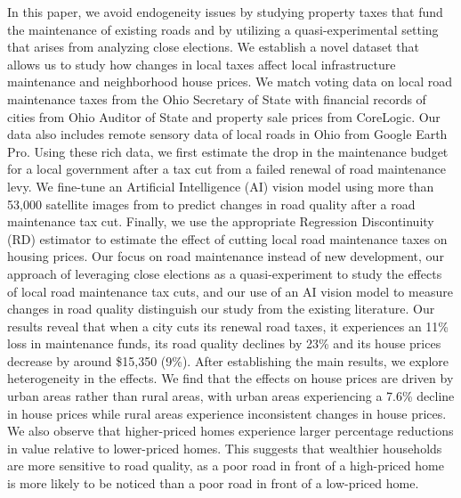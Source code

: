 In this paper, we avoid endogeneity issues by studying property taxes that fund the maintenance of existing roads and by utilizing a quasi-experimental setting that arises from analyzing close elections. We establish a novel dataset that allows us to study how changes in local taxes affect local infrastructure maintenance and neighborhood house prices. We match voting data on local road maintenance taxes from the Ohio Secretary of State with financial records of cities from Ohio Auditor of State and property sale prices from CoreLogic. Our data also includes remote sensory data of local roads in Ohio from Google Earth Pro. Using these rich data, we first estimate the drop in the maintenance budget for a local government after a tax cut from a failed renewal of road maintenance levy. We fine-tune an Artificial Intelligence (AI) vision model using more than 53,000 satellite images from \cite{brewer2021} to predict changes in road quality after a road maintenance tax cut. Finally, we use the appropriate Regression Discontinuity (RD) estimator to estimate the effect of cutting local road maintenance taxes on housing prices.
Our focus on road maintenance instead of new development, our approach of leveraging close elections as a quasi-experiment to study the effects of local road maintenance tax cuts, and our use of an AI vision model to measure changes in road quality distinguish our study from the existing literature.
Our results reveal that when a city cuts its renewal road taxes, it experiences an 11\% loss in maintenance funds, its road quality declines by 23\% and its house prices decrease by around \$15,350 (9\%). After establishing the main results, we explore heterogeneity in the effects. We find that the effects on house prices are driven by urban areas rather than rural areas, with urban areas experiencing a 7.6\% decline in house prices while rural areas experience inconsistent changes in house prices. We also observe that higher-priced homes experience larger percentage reductions in value relative to lower-priced homes. This suggests that wealthier households are more sensitive to road quality, as a poor road in front of a high-priced home is more likely to be noticed than a poor road in front of a low-priced home.

